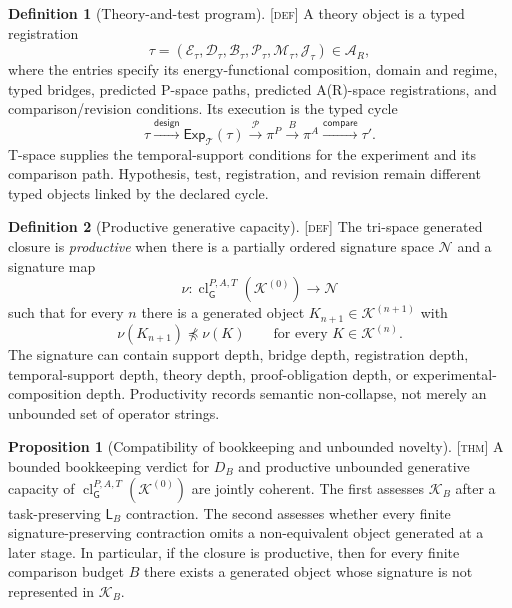 \documentclass[11pt]{article}
\newcommand{\Pspace}{\ensuremath{\mathcal{P}}}
\newcommand{\ARspace}{\ensuremath{\mathcal{A}_{R}}}
\newcommand{\Tspace}{\ensuremath{\mathcal{T}}}
\newcommand{\GOp}{\ensuremath{\mathsf{G}}}
\newcommand{\LOp}{\ensuremath{\mathsf{L}}}
\newcommand{\Defn}{\textsc{[def]}}
\newcommand{\Thm}{\textsc{[thm]}}
\theoremstyle{definition}
\newtheorem{sdefinition}{Definition}
\newtheorem{sproposition}{Proposition}
\begin{document}
\begin{sdefinition}[Theory-and-test program]
\label{def:theory-test-program}
\Defn{} A theory object is a typed registration
\begin{equation}
\tau=
\left(
\mathcal E_\tau,\mathcal D_\tau,\mathcal B_\tau,
\mathcal P_\tau,\mathcal M_\tau,\mathcal J_\tau
\right)
\in\ARspace,
\label{eq:theory-object-registration}
\end{equation}
where the entries specify its energy-functional composition, domain and regime,
typed bridges, predicted P-space paths, predicted A(R)-space registrations, and
comparison/revision conditions. Its execution is the typed cycle
\begin{equation}
\tau
\xrightarrow{\mathsf{design}}
\mathsf{Exp}_{\Tspace}(\tau)
\xrightarrow{\Pspace}
\pi^{P}
\xrightarrow{B}
\pi^{A}
\xrightarrow{\mathsf{compare}}
\tau'.
\label{eq:theory-test-cycle}
\end{equation}
T-space supplies the temporal-support conditions for the experiment and its
comparison path. Hypothesis, test, registration, and revision remain different
typed objects linked by the declared cycle.
\end{sdefinition}

\begin{sdefinition}[Productive generative capacity]
\label{def:productive-generative-capacity}
\Defn{} The tri-space generated closure is \emph{productive} when there is a
partially ordered signature space $\mathcal N$ and a signature map
\begin{equation}
\nu:\operatorname{cl}_{\GOp}^{P,A,T}(\mathcal K^{(0)})\longrightarrow\mathcal N
\label{eq:productive-signature-map}
\end{equation}
such that for every $n$ there is a generated object
$K_{n+1}\in\mathcal K^{(n+1)}$ with
\begin{equation}
\nu(K_{n+1})\not\preceq\nu(K)
\qquad
\text{for every }K\in\mathcal K^{(n)}.
\label{eq:productive-generative-capacity}
\end{equation}
The signature can contain support depth, bridge depth, registration depth,
temporal-support depth, theory depth, proof-obligation depth, or
experimental-composition depth. Productivity records semantic non-collapse, not
merely an unbounded set of operator strings.
\end{sdefinition}

\begin{sproposition}[Compatibility of bookkeeping and unbounded novelty]
\label{prop:bookkeeping-unbounded-novelty}
\Thm{} A bounded bookkeeping verdict for $D_B$ and productive unbounded
generative capacity of
$\operatorname{cl}_{\GOp}^{P,A,T}(\mathcal K^{(0)})$ are jointly coherent. The
first assesses $\mathcal K_B$ after a task-preserving $\LOp_B$ contraction. The
second assesses whether every finite signature-preserving contraction omits a
non-equivalent object generated at a later stage. In particular, if the closure is
productive, then for every finite comparison budget $B$ there exists a generated
object whose signature is not represented in $\mathcal K_B$.
\end{sproposition}
\end{document}
